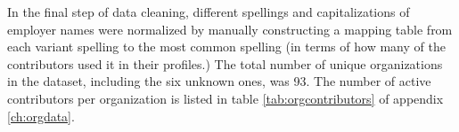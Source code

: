 In the final step of data cleaning, different spellings and capitalizations of employer names were normalized by manually constructing a mapping table from each variant spelling to the most common spelling (in terms of how many of the contributors used it in their profiles.) The total number of unique organizations in the dataset, including the six unknown ones, was 93. The number of active contributors per organization is listed in table \ref{tab:orgcontributors} of appendix \ref{ch:orgdata}.